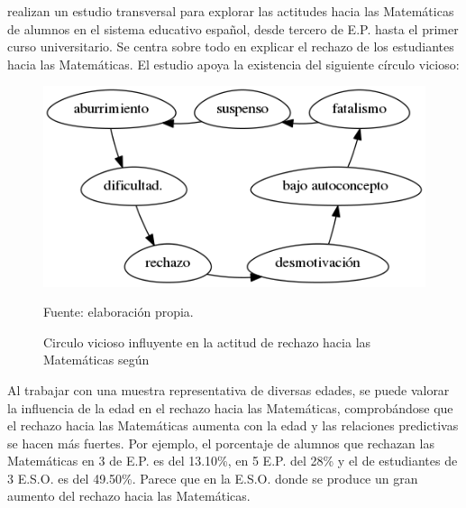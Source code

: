 \label{sec:estudioNacional}
%
\citet*{ActitudesHaciaMates} realizan un estudio transversal para explorar las actitudes hacia las Matemáticas de alumnos en el sistema educativo español, desde tercero de E.P. hasta el primer curso universitario. 
%
Se centra sobre todo en explicar el rechazo de los estudiantes hacia las Matemáticas.
%
El estudio apoya la existencia del siguiente círculo vicioso: 



\begin{figure}[hbt]
\centering
\caption{Circulo vicioso influyente en la actitud de rechazo hacia las Matemáticas según \citep{ActitudesHaciaMates}}
\label{fig::circuloVicioso}
\includegraphics[scale=0.57]{img/circuloVicioso.png}

\small{Fuente: elaboración propia.}
\end{figure}
\FloatBarrier




Al trabajar con una muestra representativa de diversas edades, se puede valorar la influencia de la edad en el rechazo hacia las Matemáticas, comprobándose que el rechazo hacia las Matemáticas aumenta con la edad y las relaciones predictivas se hacen más fuertes.
%
Por ejemplo, el porcentaje de alumnos que rechazan las Matemáticas en 3 de E.P. es del 13.10\%, en 5 E.P. del 28\%  y el de estudiantes de 3 E.S.O. es del 49.50\%.
%
Parece que en la E.S.O. donde se produce un gran aumento del rechazo hacia las Matemáticas.


